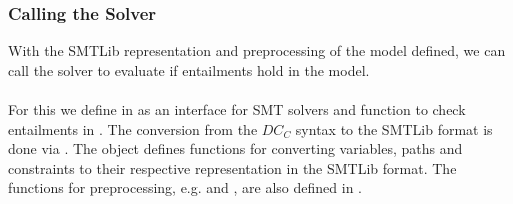 \subsubsection{Calling the Solver}
With the SMTLib representation and preprocessing
of the model defined, we can call the solver
to evaluate if entailments 
hold in the model.\\
\\
For this we define 
in  as an interface for SMT solvers
and function  to check entailments
in .
The conversion from the $DC_C$ syntax
to the SMTLib format is done via .
The object defines functions for converting variables, paths and constraints
to their respective representation in the SMTLib format.
The functions for preprocessing, e.g. 
and , are also
defined in .

